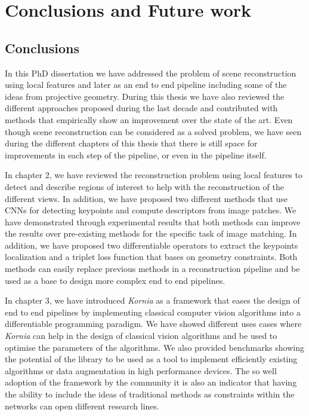 
\chapter{Conclusions and Future work}
\label{chap:end}

\section{Conclusions}

In this PhD dissertation we have addressed the problem of scene reconstruction using local features and later as an end to end pipeline including some of the ideas from projective geometry. During this thesis we have also reviewed the different approaches proposed during the last decade and contributed with methods that empirically show an improvement over the state of the art. Even though scene reconstruction can be considered as a solved problem, we have seen during the different chapters of this thesis that there is still space for improvements in each step of the pipeline, or even in the pipeline itself.

In chapter 2, we have reviewed the reconstruction problem using local features to detect and describe regions of interest to help with the reconstruction of the different views. In addition, we have proposed two different methods that use CNNs for detecting keypoints and compute descriptors from image patches. We have demonstrated through experimental results that both methods can improve the results over pre-existing methods for the specific task of image matching. In addition, we have proposed two differentiable operators to extract the keypoints localization and a triplet loss function that bases on geometry constraints. Both methods can easily replace previous methods in a reconstruction pipeline and be used as a base to design more complex end to end pipelines.

In chapter 3, we have introduced \textit{Kornia} as a framework that eases the design of end to end pipelines by implementing classical computer vision algorithms into a differentiable programming paradigm. We have showed different uses cases where \textit{Kornia} can help in the design of classical vision algorithms and be used to optimise the parameters of the algorithms. We also provided benchmarks showing the potential of the library to be used as a tool to implement efficiently existing algorithms or data augmentation in high performance devices. The so well adoption of the framework by the community it is also an indicator that having the ability to include the ideas of traditional methods as constraints within the networks can open different research lines.

